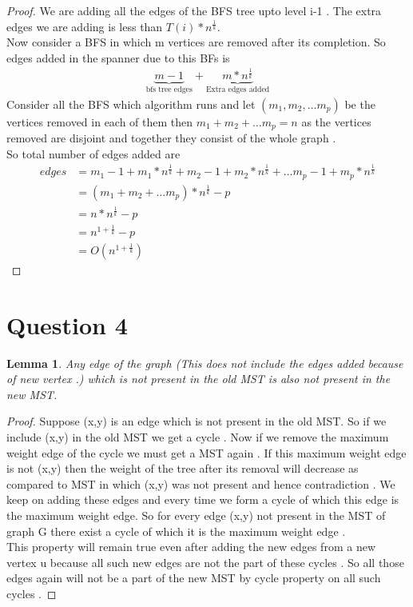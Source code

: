 \documentclass[11pt]{article}
\newtheorem{lemma}[theorem]{Lemma}
\begin{document}
\begin{proof}
We are adding all the edges of the BFS tree upto level i-1 . The extra edges we are adding is less than  $T(i) * n^{\frac{1}{k}}$. \\
Now consider a BFS in which m vertices are removed after its completion. 
So edges added in the spanner due to this BFs is 
\begin{align*}
\underbrace{m-1}_{\text{bfs tree edges}} + \underbrace{m*n^{\frac{1}{k}}}_{\text{Extra edges added}}
\end{align*}
Consider all the BFS which algorithm runs and let $(m_1,m_2, \ldots m_p)$ be the vertices removed in each of them then 
$m_1 + m_2 + \ldots m_p = n$ as the vertices removed are disjoint and together they consist of the whole graph . \\
So total number of edges added are 
\begin{align*}
edges &= m_{1} -1 + m_{1}*n^\frac{1}{k} + m_{2} -1 + m_{2}*n^\frac{1}{k} + \ldots m_{p} -1 + m_{p}*n^\frac{1}{k} \\
&= (m_{1} + m_{2} + \ldots m_{p})*n^{\frac{1}{k}} - p  \\
&= n*n^{\frac{1}{k}} - p  \\
&= n^{1+\frac{1}{k}} - p  \\
&= O(n^{1+\frac{1}{k}})
\end{align*}
\end{proof}
\pagebreak
\section*{Question 4}
\begin{lemma}
Any edge of the graph (This does not include the edges added because of new vertex .) which is not present in the old MST is also not present in the new MST. 
\end{lemma}
\begin{proof}
Suppose (x,y) is an edge which is not present in the old MST. So if we include (x,y) in the old MST we get a cycle . Now if we remove the maximum weight edge of the  cycle we must get a MST again . If this maximum weight   edge is not (x,y) then the weight of the tree after its removal will decrease as compared to MST in which (x,y) was not present and hence contradiction . We keep on adding these edges and every time we form a cycle of which this edge is the maximum weight edge. So for every edge (x,y) not present in the MST of graph G there exist a cycle of which it is the maximum weight edge .  \\
This property will remain true even after adding the new edges from a new vertex u because all such new edges are not the part of these cycles  . So all those edges again will not be a part of the new MST by cycle property on all such cycles . 
\end{proof}
\end{document}
